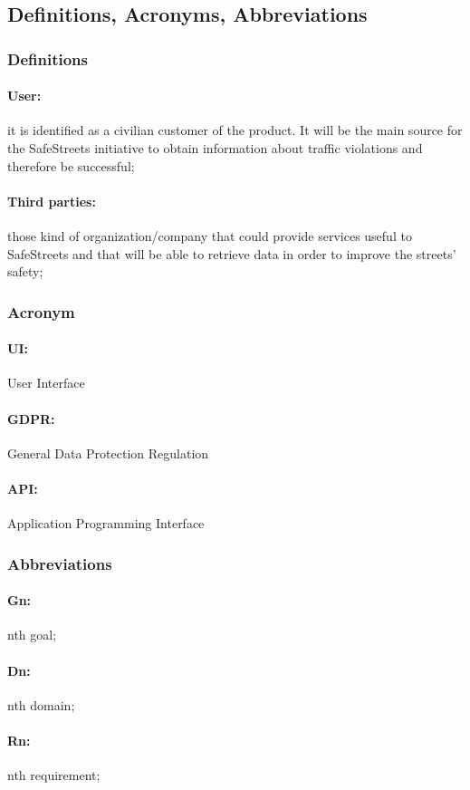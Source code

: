 \documentclass{article}
\begin{document}
\subsection{Definitions, Acronyms, Abbreviations}
\subsubsection{Definitions}
\paragraph{User:} it is identified as a civilian customer of the product. It will be the main source for the SafeStreets initiative to obtain information about traffic violations and therefore be successful;
\paragraph{Third parties:}those kind of organization/company that could provide services useful to SafeStreets and that will be able to retrieve data in order to improve the streets' safety;
\subsubsection{Acronym}
\paragraph{UI:} User Interface
\paragraph{GDPR:} General Data Protection Regulation
\paragraph{API:} Application Programming Interface
\subsubsection{Abbreviations}
\paragraph{Gn:} nth goal;
\paragraph{Dn:} nth domain;
\paragraph{Rn:} nth requirement;
\end{document}
